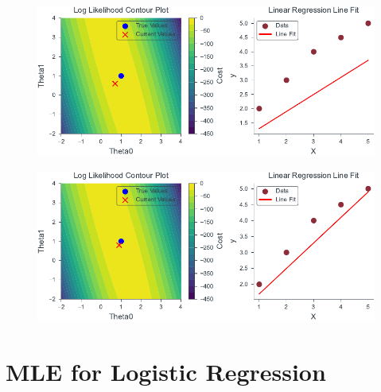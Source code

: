 \documentclass{beamer}
\begin{document}
\begin{frame}
    \begin{figure}
                \centerline{\includegraphics[scale=0.8]{../figures/mle/lin_reg_slider_2.pdf}}
\end{figure}
\end{frame}
\begin{frame}
    \begin{figure}
                \centerline{\includegraphics[scale=0.8]{../figures/mle/lin_reg_slider_3.pdf}}
\end{figure}
\end{frame}
\section{MLE for Logistic Regression}
\end{document}
